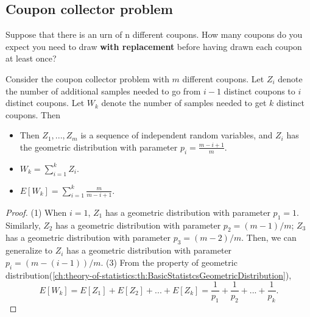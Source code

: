 \begin{refsection}
\begin{lemma}
\end{lemma}


\subsection{Coupon collector problem}
\begin{definition}
Suppose that there is an urn of n different coupons. How many coupons do you expect you need to draw \textbf{with replacement} before having drawn each coupon at least once? 
\end{definition}

\begin{lemma}
Consider the coupon collector problem with $m$ different coupons. 	
Let $Z_i$ denote the number of additional samples needed to go from $i-1$ distinct coupons to $i$ distinct coupons. Let $W_k$ denote the number of samples needed to get $k$ distinct coupons. Then
\begin{itemize}
	\item Then $Z_1,...,Z_m$ is a sequence of independent random variables, and $Z_i$ has the geometric distribution with parameter $p_i = \frac{m-i+1}{m}$.
	\item $W_k = \sum_{i=1}^{k}Z_i$.
	\item $E[W_k] = \sum_{i=1}^k \frac{m}{m-i+1}$.
\end{itemize}
\end{lemma}
\begin{proof}
(1) When $i=1$, $Z_1$ has a geometric distribution with parameter $p_1 = 1$. Similarly, $Z_2$ has a geometric distribution with parameter $p_2 = (m-1)/m$; $Z_3$ has a geometric distribution with parameter $p_3 = (m-2)/m$. Then, we can generalize to $Z_i$ has a geometric distribution with parameter $p_i = (m-(i-1))/m$.
(3) From the property of geometric distribution(\autoref{ch:theory-of-statistics:th:BasicStatistcsGeometricDistribution}),
$$E[W_k] = E[Z_1] + E[Z_2] + ... + E[Z_k] = \frac{1}{p_1} + \frac{1}{p_2} + ... + \frac{1}{p_k}.$$
\end{proof}


\end{refsection}
